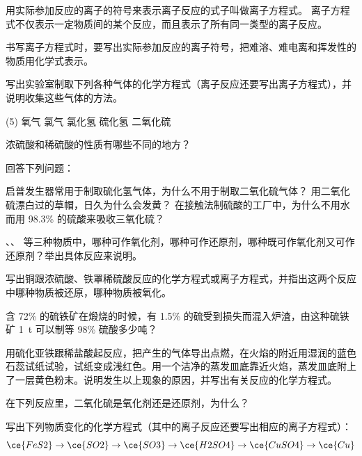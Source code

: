 用实际参加反应的离子的符号来表示离子反应的式子叫做离子方程式。
离子方程式不仅表示一定物质间的某个反应，而且表示了所有同一类型的离子反应。

书写离子方程式时，要写出实际参加反应的离子符号，把难溶、难电离和挥发性的物质用化学式表示。

\begin{Review}
  \begin{question}
    \item 写出实验室制取下列各种气体的化学方程式（离子反应还要写出离子方程式），并说明收集这些气体的方法。
    \begin{tasks}(5)
      \task 氧气
      \task 氯气
      \task 氯化氢
      \task 硫化氢
      \task 二氧化硫
    \end{tasks}
    \item 浓硫酸和稀硫酸的性质有哪些不同的地方？
    \item 回答下列问题：
    \begin{tasks}[label=(\arabic*)]
      \task 启普发生器常用于制取硫化氢气体，为什么不用于制取二氧化硫气体？
      \task 用二氧化硫漂白过的草帽，日久为什么会发黄？
      \task 在接触法制硫酸的工厂中，为什么不用水而用 98.3\% 的硫酸来吸收三氧化硫？
    \end{tasks}
    \item {}、、 等三种物质中，哪种可作氧化剂，哪种可作还原剂，哪种既可作氧化剂又可作还原剂？举出具体反应来说明。
    \item 写出铜跟浓硫酸、铁罩稀硫酸反应的化学方程式或离子方程式，并指出这两个反应中哪种物质被还原，哪种物质被氧化。
    \item 含  72\% 的硫铁矿在煅烧的时候，有 1.5\% 的硫受到损失而混入炉渣，由这种硫铁矿 \qty{1}{t} 可以制等 98\% 硫酸多少吨？
    \item 用硫化亚铁跟稀盐酸起反应，把产生的气体导出点燃，在火焰的附近用湿润的蓝色石蕊试纸试验，试纸变成浅红色。用一个洁净的蒸发皿底靠近火焰，蒸发皿底附上了一层黄色粉末。说明发生以上现象的原因，并写出有关反应的化学方程式。
    \item 在下列反应里，二氧化硫是氧化剂还是还原剂，为什么？
    \begin{tasks}
      \task {}
      \task {}
    \end{tasks}
    \item 写出下列物质变化的化学方程式（其中的离子反应还要写出相应的离子方程式）：
    \[ \ce{FeS2} \to \ce{SO2} \to \ce{SO3} \to \ce{H2SO4} \to \ce{CuSO4} \to \ce{Cu} \]
  \end{question}
\end{Review}